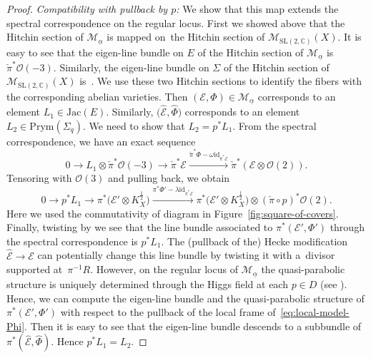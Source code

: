 \documentclass[10pt,a4paper]{amsart}
\numberwithin{equation}{section}
\theoremstyle{definition}
\newcommand{\Jac}{\mathrm{Jac}}
\renewcommand{\to}{\rightarrow}
\newcommand{\ualpha}{\underline{\alpha}}
\newcommand{\calE}{\mathcal{E}}
\newcommand{\calM}{\mathcal{M}}
\newcommand{\calO}{\mathcal{O}}
\newcommand{\CC}{\mathbb{C}}
\newcommand{\id}{\mathrm{id}}
\newcommand{\Prym}{\mathrm{Prym}}
\newcommand{\SL}{\mathrm{SL}}
\begin{document}
\begin{proof}
 \textit{Compatibility with pullback by $p$:} We show that this map extends the spectral correspondence on the regular locus. First we showed above that the Hitchin section of $\calM_{\underline{\alpha}}$ is mapped on~the Hitchin section of $\calM_{\SL(2,\CC)}(X)$. It is easy to see that the eigen-line bundle on $E$ of the Hitchin section of $\calM_{\underline{\alpha}}$ is $\check{\pi}^*\calO(-3)$. Similarly, the eigen-line bundle on $\Sigma$ of the Hitchin section of~$\calM_{\SL(2,\CC)}(X)$ is~. We use these two Hitchin sections to identify the fibers with the corresponding abelian varieties. Then $(\calE,\Phi) \in \calM_{\ualpha}$ corresponds to an element $L_1 \in \Jac(E)$. Similarly, $\bigl(\hat{\calE},\hat{\Phi}\bigr)$ corresponds to an element $L_2 \in \Prym(\Sigma_q)$. We need to show that $L_2=p^*L_1$. From the spectral correspondence, we have an exact sequence
 \[ 0 \to L_1 \otimes \check{\pi}^*\calO(-3) \to \check{\pi}^*\calE \xrightarrow{\check{\pi}^*\Phi-\omega \id_{\check{\pi}^* \calE}} \check{\pi}^* (\calE \otimes \calO(2) ).
 \]
 Tensoring with $\calO(3)$ and pulling back, we obtain
 \[ 0 \to p^*L_1 \to \pi^*\bigl(\calE' \otimes K_X^{\frac12}\bigr) \xrightarrow{\pi^*\Phi'-\lambda \id_{\check{\pi}^* \calE}} \pi^*\bigl(\calE' \otimes K_X^{\frac12}\bigr) \otimes (\check{\pi} \circ p)^*\calO(2).
 \]
 Here we used the commutativity of diagram in Figure~\ref{fig:square-of-covers}.
 Finally, twisting by  we see that the line bundle associated to $\pi^*(\calE',\Phi')$ through the spectral correspondence is $p^*L_1$. The (pullback of the) Hecke modification $\hat{\calE} \to \calE$ can potentially change this line bundle by twisting it with a~divisor supported at~$\pi^{-1}R$. However, on the regular locus of $\calM_{\underline{\alpha}}$ the quasi-parabolic structure is uniquely determined through the Higgs field at each $p \in D$ (see \cite[Proposition~8.1]{FMSW}). Hence, we can compute the eigen-line bundle and the quasi-parabolic structure of $\pi^*(\calE',\Phi')$ with respect to the pullback of the local frame of~\eqref{eq:local-model-Phi}. Then it is easy to see that the eigen-line bundle  descends to a subbundle of $\pi^*(\hat{\calE},\hat{\Phi})$. Hence $p^*L_1=L_2$.



\end{proof}
\end{document}
